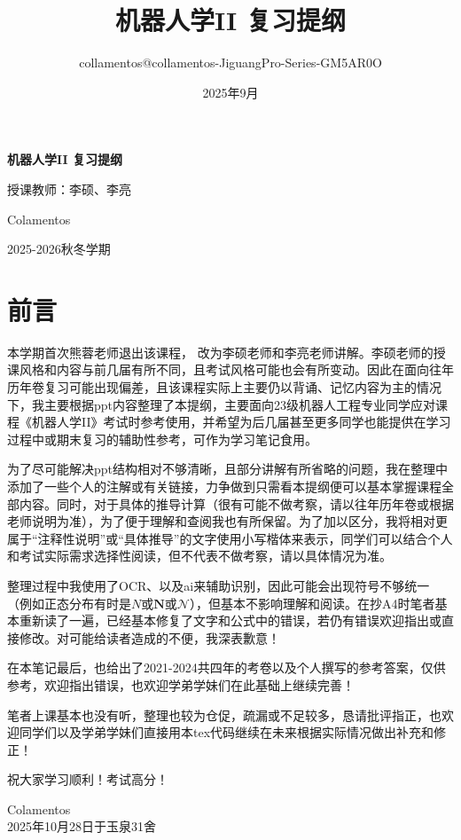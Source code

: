 \documentclass[a4paper,11pt]{article}
\title{机器人学II 复习提纲 \\ \vspace{0.5cm} \large }
\author{collamentos@collamentos-JiguangPro-Series-GM5AR0O}
\date{2025年9月}
\begin{document}
\begin{titlepage}
    \centering
    \vspace*{3cm}
    {\Huge \textbf{机器人学II 复习提纲} \par}
    \vspace{0.5cm}
    {\Large 授课教师：李硕、李亮\par}
    \vspace{3cm}
    {\Large Colamentos \par}
    {\Large 2025-2026秋冬学期 \par}
\end{titlepage}

\section*{前言}

本学期首次熊蓉老师退出该课程， 改为李硕老师和李亮老师讲解。李硕老师的授课风格和内容与前几届有所不同，且考试风格可能也会有所变动。因此在面向往年历年卷复习可能出现偏差，且该课程实际上主要仍以背诵、记忆内容为主的情况下，我主要根据ppt内容整理了本提纲，主要面向23级机器人工程专业同学应对课程《机器人学II》考试时参考使用，并希望为后几届甚至更多同学也能提供在学习过程中或期末复习的辅助性参考，可作为学习笔记食用。

为了尽可能解决ppt结构相对不够清晰，且部分讲解有所省略的问题，我在整理中添加了一些个人的注解或有关链接，力争做到只需看本提纲便可以基本掌握课程全部内容。同时，对于具体的推导计算（很有可能不做考察，请以往年历年卷或根据老师说明为准），为了便于理解和查阅我也有所保留。为了加以区分，我将相对更属于“注释性说明”或“具体推导”的文字使用小写楷体来表示，同学们可以结合个人和考试实际需求选择性阅读，但不代表不做考察，请以具体情况为准。

整理过程中我使用了OCR、以及ai来辅助识别，因此可能会出现符号不够统一（例如正态分布有时是$N$或$\mathbf{N}$或$\mathcal{N}$），但基本不影响理解和阅读。在抄A4时笔者基本重新读了一遍，已经基本修复了文字和公式中的错误，若仍有错误欢迎指出或直接修改。对可能给读者造成的不便，我深表歉意！

在本笔记最后，也给出了2021-2024共四年的考卷以及个人撰写的参考答案，仅供参考，欢迎指出错误，也欢迎学弟学妹们在此基础上继续完善！

笔者上课基本也没有听，整理也较为仓促，疏漏或不足较多，恳请批评指正，也欢迎同学们以及学弟学妹们直接用本tex代码继续在未来根据实际情况做出补充和修正！

祝大家学习顺利！考试高分！

\begin{flushright}
Colamentos\\
2025年10月28日于玉泉31舍
\end{flushright}
\newpage
\tableofcontents
\thispagestyle{empty}
\newpage












\end{document}
